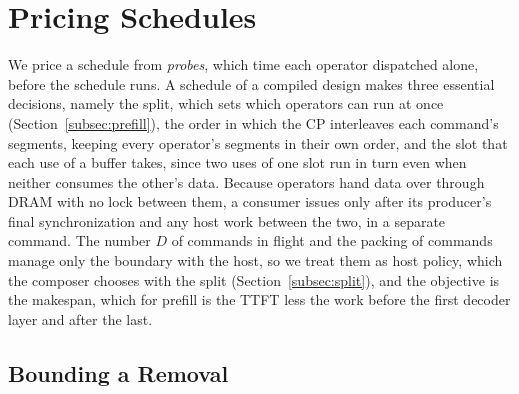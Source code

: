 \section{Pricing Schedules}
\label{sec:pricing}

\label{subsec:formulation}
We price a schedule from \emph{probes}, which time each operator dispatched alone, before the schedule runs.
A schedule of a compiled design makes three essential decisions, namely the split, which sets which operators can run at once (Section~\ref{subsec:prefill}), the order in which the CP interleaves each command's segments, keeping every operator's segments in their own order, and the slot that each use of a buffer takes, since two uses of one slot run in turn even when neither consumes the other's data.
Because operators hand data over through DRAM with no lock between them, a consumer issues only after its producer's final synchronization and any host work between the two, in a separate command.
The number $D$ of commands in flight and the packing of commands manage only the boundary with the host, so we treat them as host policy, which the composer chooses with the split (Section~\ref{subsec:split}), and the objective is the makespan, which for prefill is the TTFT less the work before the first decoder layer and after the last.

\subsection{Bounding a Removal}
\label{subsec:removal}

